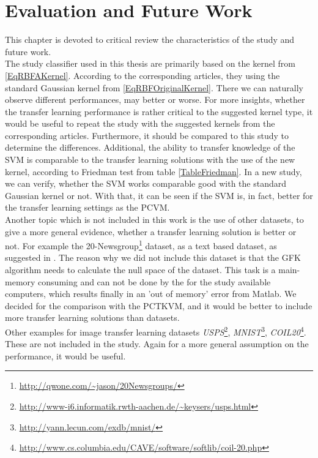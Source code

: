 \chapter{Evaluation and Future Work}\label{EvalF}	
This chapter is devoted to critical review the characteristics of the study and future work.\\
The study classifier used in this thesis are primarily based on the kernel from \eqref{EqRBFAKernel}.
According to the corresponding articles, they using the standard Gaussian kernel from \eqref{EqRBFOriginalKernel}.\cite{Long.}\cite{Gong.}\cite{Pan.2011}
There we can naturally observe different performances, may better or worse.
For more insights, whether the transfer learning performance is rather critical to the suggested kernel type, it would be useful to repeat the study with the suggested kernels from the corresponding articles.
Furthermore, it should be compared to this study to determine the differences.
Additional, the ability to transfer knowledge of the \acs{SVM} is comparable to the transfer learning solutions with the use of the new kernel, according to Friedman test from table \ref{TableFriedman}.
In a new study, we can verify, whether the \acs{SVM} works comparable good with the standard Gaussian kernel or not.
With that, it can be seen if the \acs{SVM} is, in fact, better for the transfer learning settings as the \acs{PCVM}.\\
Another topic which is not included in this work is the use of other datasets, to give a more general evidence, whether a transfer learning solution is better or not.
For example the 20-Newsgroup\footnote{\url{http://qwone.com/~jason/20Newsgroups/}} dataset, as a text based dataset, as suggested in \cite{Pan.2010}.
The reason why we did not include this dataset is that the \acs{GFK} algorithm needs to calculate the null space of the dataset.
This task is a main-memory consuming and can not be done by the for the study available computers, which results finally in an 'out of memory' error from Matlab.
We decided for the comparison with the \acs{PCTKVM}, and it would be better to include more transfer learning solutions than datasets.\\
Other examples for image transfer learning datasets \textit{USPS}\footnote{\url{http://www-i6.informatik.rwth-aachen.de/~keysers/usps.html}}, \textit{MNIST}\footnote{\url{http://yann.lecun.com/exdb/mnist/}}, \textit{COIL20}\footnote{\url{http://www.cs.columbia.edu/CAVE/software/softlib/coil-20.php}}.\cite{Long.}\cite{Long.2014}
These are not included in the study. Again for a more general assumption on the performance, it would be useful.
